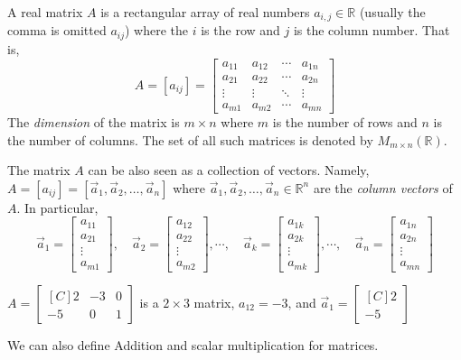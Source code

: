 \begin{definition}[Matrix]
A real matrix $A$ is a rectangular array of real numbers 
$a_{i,j} \in \mathbb{R}$ (usually the comma is omitted $a_{ij}$)  where the $i$ 
is the row and $j$ is the column number. That is, 
\[
A=[a_{ij}]=\begin{bmatrix}
a_{11} & a_{12} & \cdots & a_{1n} \\
a_{21} & a_{22} & \cdots & a_{2n} \\
\vdots & \vdots & \ddots & \vdots \\
a_{m1} & a_{m2} & \cdots & a_{mn} 
\end{bmatrix}
\]
The \emph{dimension} of the matrix is $m\times n$ where $m$ is the number of 
rows and $n$ is the number of columns. The set of all such matrices is denoted 
by $M_{m\times n}(\mathbb{R})$. 
\end{definition}
The matrix $A$ can be also seen as a collection of vectors. Namely, 
$A=[a_{ij}]=[\vec{a}_1, \vec{a}_2, \ldots, \vec{a}_n]$ where 
 $\vec{a}_1, \vec{a}_2,\ldots, \vec{a}_n \in \mathbb{R}^n$ are the \emph{column 
vectors} of $A$. In particular, 
\[
\vec{a}_1=\begin{bmatrix}a_{11}\\a_{21}\\ \vdots \\ a_{m1}\end{bmatrix}, \quad 
\vec{a}_2=\begin{bmatrix}a_{12}\\a_{22}\\ \vdots \\ a_{m2}\end{bmatrix}, 
\cdots, \quad 
\vec{a}_k=\begin{bmatrix}a_{1k}\\a_{2k}\\ \vdots \\ a_{mk}\end{bmatrix}, 
\cdots, \quad 
\vec{a}_n=\begin{bmatrix}a_{1n}\\a_{2n}\\ \vdots \\ a_{mn}\end{bmatrix}
\]

\begin{example}
$A=\begin{bmatrix*}[C]
2 & -3 & 0 \\
-5 & 0 & 1 
\end{bmatrix*}$
is a $2 \times 3$ matrix, $a_{12}=-3$, and  
$\vec{a}_1=\begin{bmatrix*}[C] 2 \\ -5 \end{bmatrix*}$
\end{example}
We can also define Addition and scalar multiplication for matrices.

